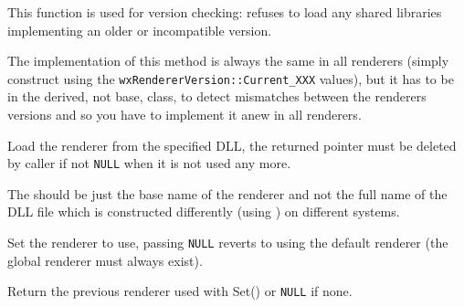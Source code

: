 \label{wxrenderernativegetversion}


This function is used for version checking:  
refuses to load any shared libraries implementing an older or incompatible
version.

The implementation of this method is always the same in all renderers (simply
construct  using the 
{\tt wxRendererVersion::Current\_XXX} values), but it has to be in the derived,
not base, class, to detect mismatches between the renderers versions and so you
have to implement it anew in all renderers.


\label{wxrenderernativeload}


Load the renderer from the specified DLL, the returned pointer must be
deleted by caller if not {\tt NULL} when it is not used any more.

The  should be just the base name of the renderer and not the full
name of the DLL file which is constructed differently (using 
) 
on different systems.


\label{wxrenderernativeset}


Set the renderer to use, passing {\tt NULL} reverts to using the default
renderer (the global renderer must always exist).

Return the previous renderer used with Set() or {\tt NULL} if none.

